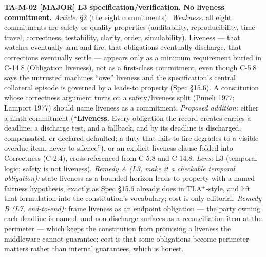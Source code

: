 \documentclass[11pt,a4paper]{article}
\newcommand{\sev}[1]{\textbf{[#1]}}
\newcommand{\lens}[1]{\textnormal{#1}}
\newcommand{\finding}[1]{\medskip\noindent\textbf{#1}}
\begin{document}
\finding{TA-M-02 \sev{MAJOR} \lens{L3 specification/verification}. No liveness commitment.}
\emph{Article:} §2 (the eight commitments). \emph{Weakness:} all eight commitments are safety
or quality properties (auditability, reproducibility, time-travel, correctness, testability,
clarity, order, simulability). Liveness --- that watches eventually arm and fire, that
obligations eventually discharge, that corrections eventually settle --- appears only as a
minimum requirement buried in C-14.8 (Obligation liveness), not as a first-class commitment,
even though C-5.8 says the untrusted machines ``owe'' liveness and the specification's
central collateral episode is governed by a leads-to property (Spec §15.6). A constitution
whose correctness argument turns on a safety/liveness split (Pnueli 1977; Lamport 1977) should
name liveness as a commitment. \emph{Proposed addition:} either a ninth commitment
(``\textbf{Liveness.} Every obligation the record creates carries a deadline, a discharge test,
and a fallback, and by its deadline is discharged, compensated, or declared defaulted; a duty
that fails to fire degrades to a visible overdue item, never to silence''), or an explicit
liveness clause folded into Correctness (C-2.4), cross-referenced from C-5.8 and C-14.8.
\emph{Lens:} L3 (temporal logic; safety is not liveness). \emph{Remedy A (L3, make it a
checkable temporal obligation):} state liveness as a bounded-horizon leads-to property with a
named fairness hypothesis, exactly as Spec §15.6 already does in TLA$^{+}$-style, and lift that
formulation into the constitution's vocabulary; cost is only editorial. \emph{Remedy B (L7,
end-to-end):} frame liveness as an endpoint obligation --- the party owning each deadline is
named, and non-discharge surfaces as a reconciliation item at the perimeter --- which keeps the
constitution from promising a liveness the middleware cannot guarantee; cost is that some
obligations become perimeter matters rather than internal guarantees, which is honest.
\end{document}
